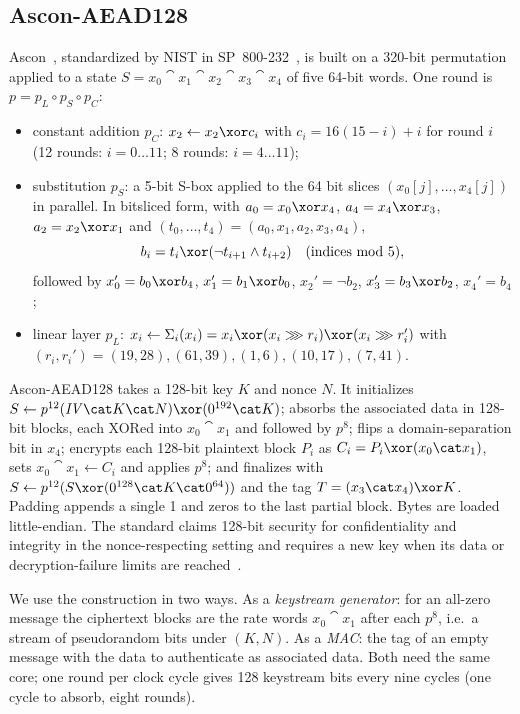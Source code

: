 \subsection{Ascon-AEAD128}\label{sec:ascon}
Ascon~\cite{ascon}, standardized by NIST in SP~800-232~\cite{sp800232}, is built on a 320-bit permutation applied to a state $S = x_0 \cat x_1 \cat x_2 \cat x_3 \cat x_4$ of five 64-bit words. One round is $p = p_L \circ p_S \circ p_C$:
\begin{itemize}
\item constant addition $p_C$: $x_2 \leftarrow x_2 \xor c_i$ with $c_i = 16(15 - i) + i$ for round $i$ (12 rounds: $i = 0 \ldots 11$; 8 rounds: $i = 4 \ldots 11$);
\item substitution $p_S$: a 5-bit S-box applied to the 64 bit slices $(x_0[j], \ldots, x_4[j])$ in parallel. In bitsliced form, with $a_0 = x_0 \xor x_4$, $a_4 = x_4 \xor x_3$, $a_2 = x_2 \xor x_1$ and $(t_0, \ldots, t_4) = (a_0, x_1, a_2, x_3, a_4)$,
\begin{equation}
b_i = t_i \xor (\neg t_{i+1} \wedge t_{i+2}) \quad (\text{indices mod } 5),
\label{eq:chi}
\end{equation}
followed by $x_0' = b_0 \xor b_4$, $x_1' = b_1 \xor b_0$, $x_2' = \neg b_2$, $x_3' = b_3 \xor b_2$, $x_4' = b_4$;
\item linear layer $p_L$: $x_i \leftarrow \Sigma_i(x_i) = x_i \xor (x_i \ggg r_i) \xor (x_i \ggg r_i')$ with $(r_i, r_i') = (19, 28), (61, 39), (1, 6), (10, 17), (7, 41)$.
\end{itemize}
Ascon-AEAD128 takes a 128-bit key $K$ and nonce $N$. It initializes $S \leftarrow p^{12}(\mathit{IV} \cat K \cat N) \xor (0^{192} \cat K)$; absorbs the associated data in 128-bit blocks, each XORed into $x_0 \cat x_1$ and followed by $p^8$; flips a domain-separation bit in $x_4$; encrypts each 128-bit plaintext block $P_i$ as $C_i = P_i \xor (x_0 \cat x_1)$, sets $x_0 \cat x_1 \leftarrow C_i$ and applies $p^8$; and finalizes with $S \leftarrow p^{12}(S \xor (0^{128} \cat K \cat 0^{64}))$ and the tag $T = (x_3 \cat x_4) \xor K$. Padding appends a single 1 and zeros to the last partial block. Bytes are loaded little-endian. The standard claims 128-bit security for confidentiality and integrity in the nonce-respecting setting and requires a new key when its data or decryption-failure limits are reached~\cite{sp800232}.

We use the construction in two ways. As a \emph{keystream generator}: for an all-zero message the ciphertext blocks are the rate words $x_0 \cat x_1$ after each $p^8$, i.e.\ a stream of pseudorandom bits under $(K, N)$. As a \emph{MAC}: the tag of an empty message with the data to authenticate as associated data. Both need the same core; one round per clock cycle gives 128 keystream bits every nine cycles (one cycle to absorb, eight rounds).

